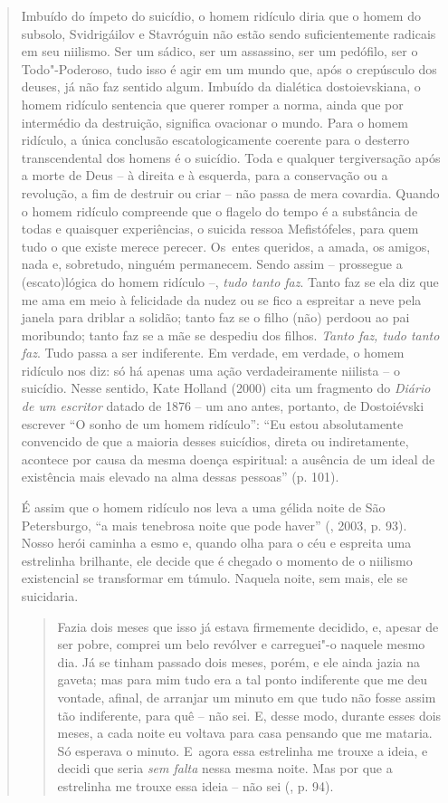 {\begin{quote}
Imbuído do ímpeto do suicídio, o homem ridículo diria que o homem do
subsolo, Svidrigáilov e Stavróguin não estão sendo suficientemente
radicais em seu niilismo. Ser um sádico, ser um assassino, ser um
pedófilo, ser o Todo"-Poderoso, tudo isso é agir em um mundo que, após o
crepúsculo dos deuses, já não faz sentido algum. Imbuído da dialética
dostoievskiana, o homem ridículo sentencia que querer romper a norma,
ainda que por intermédio da destruição, significa ovacionar o mundo.
Para o homem ridículo, a única conclusão escatologicamente coerente para
o desterro transcendental dos homens é o suicídio. Toda e qualquer
tergiversação após a morte de Deus -- à direita e à esquerda, para a
conservação ou a revolução, a fim de destruir ou criar -- não passa de
mera covardia. Quando o homem ridículo compreende que o flagelo do tempo
é a substância de todas e quaisquer experiências, o suicida ressoa
Mefistófeles, para quem tudo o que existe merece perecer. Os~entes
queridos, a amada, os amigos, nada e, sobretudo, ninguém permanecem.
Sendo assim -- prossegue a (escato)lógica do homem ridículo --,
\emph{tudo tanto faz}. Tanto faz se ela diz que me ama em meio à
felicidade da nudez ou se fico a espreitar a neve pela janela para
driblar a solidão; tanto faz se o filho (não) perdoou ao pai moribundo;
tanto faz se a mãe se despediu dos filhos. \emph{Tanto faz, tudo tanto
faz}. Tudo passa a ser indiferente. Em verdade, em verdade, o homem
ridículo nos diz: só há apenas uma ação verdadeiramente niilista -- o
suicídio. Nesse sentido, Kate Holland (2000) cita um fragmento do
\emph{Diário de um escritor} datado de 1876 -- um ano antes, portanto,
de Dostoiévski escrever ``O sonho de um homem ridículo'': ``Eu estou
absolutamente convencido de que a maioria desses suicídios, direta ou
indiretamente, acontece por causa da mesma doença espiritual: a ausência
de um ideal de existência mais elevado na alma dessas pessoas'' (p.
101).

É assim que o homem ridículo nos leva a uma gélida noite de São
Petersburgo, ``a mais tenebrosa noite que pode haver'' (,
2003, p. 93). Nosso herói caminha a esmo e, quando olha para o céu e
espreita uma estrelinha brilhante, ele decide que é chegado o momento de
o niilismo existencial se transformar em túmulo. Naquela noite, sem
mais, ele se suicidaria.

\begin{quote}
Fazia dois meses que isso já estava firmemente decidido, e, apesar de
ser pobre, comprei um belo revólver e carreguei"-o naquele mesmo dia. Já
se tinham passado dois meses, porém, e ele ainda jazia na gaveta; mas
para mim tudo era a tal ponto indiferente que me deu vontade, afinal, de
arranjar um minuto em que tudo não fosse assim tão indiferente, para quê
-- não sei. E, desse modo, durante esses dois meses, a cada noite eu
voltava para casa pensando que me mataria. Só esperava o minuto. E~agora
essa estrelinha me trouxe a ideia, e decidi que seria \emph{sem falta}
nessa mesma noite. Mas por que a estrelinha me trouxe essa ideia -- não
sei (, p. 94).
\end{quote}


\end{quote}}
